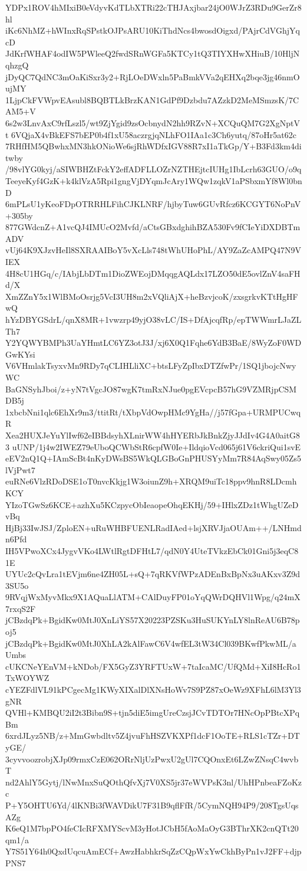 YDPx1ROV4hMIxiB0eVdyvKdTLbXTRi22cTHJAxjbar24jO0WJrZ3RDu9GerZr8hl
iKc6NhMZ+hWInxRqSPstkOJPsARU10KiThdNcs4bwosdOigxd/PAjrCdVGhjYqcD
JdKrfWHAF4odIW5PWleeQ2fwdSRnWGFa5KTCy1tQ3TIYXHwXHiuB/10HljNqhzgQ
jDyQC7QdNC3mOaKiSxr3y2+RjLOeDWxln5PaBmkVVa2qEHXq2bqe3jg46nmOujMY
1LjpCkFVWpvEAsubl8BQBTLkBrzKAN1GdPf9Dzbdu7AZzkD2MeMSmzsK/7CAM5+V
6s2w3LnvAxC9rfLszl5/wt9ZjYgid9zsOcbnydN2hh9RZvN+XCQuQM7G2XgNptVt
6VQjaX4vBkEFS7bEP0b4f1xU58aczrgjqNLhFO1IAa1c3Ch6yutq/87oHr5at62c
7RHfHM5QBwhxMN3hkONioWe6sjRhWDfxIGV88R7xI1aTkGp/Y+B3Fd3km4ditwby
/98vlYG0kyj/aSIWBHZtFckY2effADFLLOZrNZTHEjtcIUHg1IbLcrh63GUO/o9q
TeeyeKyf4GzK+k4klVzA5Rpi1gngVjDYqmJcAry1WQw1zqkV1aPSbxmYf8Wl0bnD
6mPLsU1yKeoFDpOTRRHLFihCJKLNRF/hjbyTuw6GUvRfcz6KCGYT6NoPnV+305by
877GWdcnZ+A1vcQJ4IMUcO2Mvfd/aCtsGBxdghihBZA530Fv9fCIeYiDXDBTmADV
vUj64K9XJzvHeIl8SXRAAIBoY5vXcLls748tWhUHoPhL/AY9ZaZcAMPQ47N9VIEX
4H8cU1HGq/c/IAbjLbDTm1DioZWEojDMqqgAQLdx17LZO50dE5ovlZnV4saFHd/X
XmZZnY5x1WlBMoOsrjg5VcI3UH8m2xVQliAjX+heBzvjcoK/zxsgrkvKTtHgHFwQ
hYzDBYGSdrL/qnX8MR+1vwzrp49yjO38vLC/IS+DfAjcqfRp/epTWWmrLJaZLTh7
Y2YQWYBMPh3UaYHmtLC6YZ3otJ3J/xj6X0Q1Fqhe6YdB3BaE/8WyZoF0WDGwKYsi
V6VHmlakTsyxvMn9RDy7qCLIHLliXC+btsLFyZpIbxDTZfwPr/1SQ1jbojcNwyWC
BaGNSyhJboi/z+yN7tVgcJO87wgK7tmRxNJue0pgEVcpcB57hG9VZMRjpCSMDB5j
1xbcbNni1qlc6EhXr9m3/ttitRt/tXbpVdOwpHMc9YgHa//j57fGpa+URMPUCwqR
Xea2HUXJeYuYlIwf62eIBBdsyhXLnirWW4hHYERbJkBnkZjyJJdIv4G4A0aitG83
uUNP/1j4w2IWEZ79eUboQCWbStR6cpfW0Ie+IldqioVcd065j61V6ckriQui1svE
eEV2nQ1Q+IAmScBt4nKyDWsBS5WkQLGBoGnPHUSYyMm7R84AqSwy05Zs5lVjPwt7
euRNe6VlzRDoDSE1oT0nvcKkjg1W3oiunZ9h+XRQM9uiTc18ppv9hnR8LDcmhKCY
YIzoTGwSz6KCE+azhXu5KCzpycObIeaopeOhqEKHj/59+IHlxZDz1tWhgUZeDvBq
HjBj33IwJSJ/ZploEN+uRuWHBFUENLRadIAed+lsjXRVJjaOUAm++/LNHmdn6Pfd
IH5VPwoXCx4JygvVKo4LWtlRgtDFHtL7/qdN0Y4UteTVkzEbCk01Gni5j3eqC81E
UYUc2cQvLra1tEVjm6ne4ZH05L+sQ+7qRKVfWPzADEnBxBpNx3uAKxv3Z9d3SU5o
9RVqjWxMyvMkx9X1AQuaLlATM+CAlDuyFP01oYqQWrDQHVl1Wpg/q24mX7rxqS2F
jCBzdqPk+BgidKw0MtJ0XnLiYS57X20223PZSKu3HuSUKYnLY8lnReAU6B78poj5
jCBzdqPk+BgidKw0MtJ0XhLA2kAlFawC6V4wfEL3tW34Cl039BKwfPkwML/aUmbs
cUKCNeYEnVM+kNDob/FX5GyZ3YRFTUxW+7taIcaMC/UfQMd+XiI8HcRo1TxWOYWZ
cYEZFdlVL91kPCgecMg1KWyXIXalDlXNsHoWv7S9PZ87xOeWz9XFhL6lM3Yl3gNR
QVHl+KMBQU2iI2t3Bibn9S+tjn5diE5imgUreCzsjJCvTDTOr7HNcOpPBtcXPqBm
6xrdJLyz5NB/z+MmGwbdltv5Z4jvuFhHSZVKXPf1dcF1OoTE+RLS1cTZr+DTyGE/
3cyvvoozrobjXJp09rmxCzE062ORrNljUzPwxU2gUl7CQOnxEt6LZwZNsqC4wvbT
nd2AhlY5Gytj/lNwMnxSuQOthQfvXj7V0XS5jr37eWVPsK3nl/UhHPnbeaFZoKzc
P+Y5OHTU6Yd/4lKNBi3fWAVDikU7F31B9qflFfR/5CymNQH94P9/208TgsUqsAZg
K6eQ1M7bpPO4feCIcRFXMYScvM3yHotJCbH5fAoMaOyG3BThrXK2cnQTt20qm1/a
Y7S51Y64h0QxdUqcuAmECf+AwzHabhkrSqZzCQpWxYwCkhByPn1vJ2FF+djpPNS7
